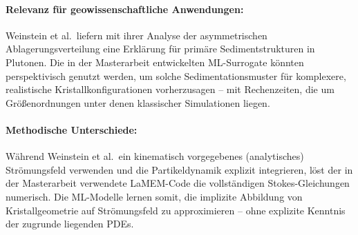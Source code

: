 \documentclass[a4paper,12pt]{article}
\begin{document}
\paragraph{Relevanz für geowissenschaftliche Anwendungen:}
Weinstein et al.\ liefern mit ihrer Analyse der asymmetrischen Ablagerungsverteilung eine Erklärung für primäre Sedimentstrukturen in Plutonen. Die in der Masterarbeit entwickelten ML-Surrogate könnten perspektivisch genutzt werden, um solche Sedimentationsmuster für komplexere, realistische Kristallkonfigurationen vorherzusagen -- mit Rechenzeiten, die um Größenordnungen unter denen klassischer Simulationen liegen.

\paragraph{Methodische Unterschiede:}
Während Weinstein et al.\ ein kinematisch vorgegebenes (analytisches) Strömungsfeld verwenden und die Partikeldynamik explizit integrieren, löst der in der Masterarbeit verwendete LaMEM-Code die vollständigen Stokes-Gleichungen numerisch. Die ML-Modelle lernen somit, die implizite Abbildung von Kristallgeometrie auf Strömungsfeld zu approximieren -- ohne explizite Kenntnis der zugrunde liegenden PDEs.
\end{document}
